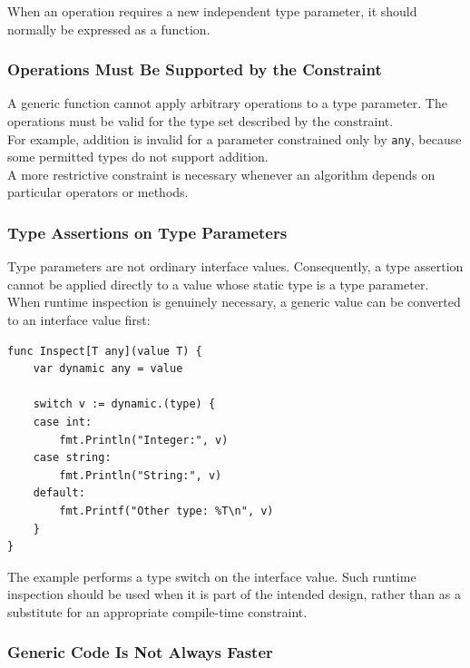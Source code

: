 When an operation requires a new independent type parameter, it should normally be expressed as a function.

\subsubsection{Operations Must Be Supported by the Constraint}

A generic function cannot apply arbitrary operations to a type parameter. The operations must be valid for the type set described by the constraint.\\

For example, addition is invalid for a parameter constrained only by \texttt{any}, because some permitted types do not support addition.\\

A more restrictive constraint is necessary whenever an algorithm depends on particular operators or methods.

\subsubsection{Type Assertions on Type Parameters}

Type parameters are not ordinary interface values. Consequently, a type assertion cannot be applied directly to a value whose static type is a type parameter.\\

When runtime inspection is genuinely necessary, a generic value can be converted to an interface value first:

\begin{lstlisting}
func Inspect[T any](value T) {
    var dynamic any = value

    switch v := dynamic.(type) {
    case int:
        fmt.Println("Integer:", v)
    case string:
        fmt.Println("String:", v)
    default:
        fmt.Printf("Other type: %T\n", v)
    }
}
\end{lstlisting}

The example performs a type switch on the interface value. Such runtime inspection should be used when it is part of the intended design, rather than as a substitute for an appropriate compile-time constraint.

\subsubsection{Generic Code Is Not Always Faster}

